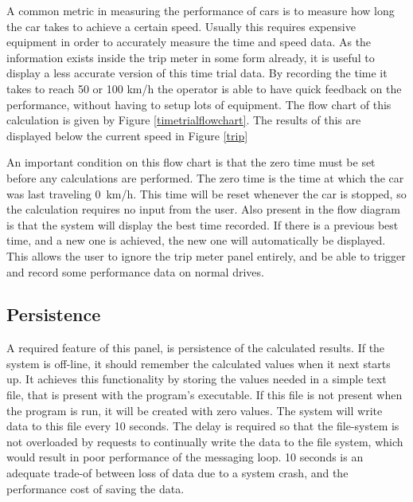 A common metric in measuring the performance of cars is to measure how long the car takes to achieve a certain speed. Usually this requires expensive equipment in order to accurately measure the time and speed data. As the information exists inside the trip meter in some form already, it is useful to display a less accurate version of this time trial data. By recording the time it takes to reach 50 or 100 km/h the operator is able to have quick feedback on the performance, without having to setup lots of equipment. The flow chart of this calculation is given by Figure \ref{timetrialflowchart}. The results of this are displayed below the current speed in Figure \ref{trip}


An important condition on this flow chart is that the zero time must be set before any calculations are performed. The zero time is the time at which the car was last traveling 0~km/h. This time will be reset whenever the car is stopped, so the calculation requires no input from the user. Also present in the flow diagram is that the system will display the best time recorded. If there is a previous best time, and a new one is achieved, the new one will automatically be displayed. This allows the user to ignore the trip meter panel entirely, and be able to trigger and record some performance data on normal drives.

\subsection{Persistence}
\label{sec:tripersistence}

A required feature of this panel, is persistence of the calculated results. If the system is off-line, it should remember the calculated values when it next starts up. It achieves this functionality by storing the values needed in a simple text file, that is present with the program's executable. If this file is not present when the program is run, it will be created with zero values. The system will write data to this file every 10 seconds. The delay is required so that the file-system is not overloaded by requests to continually write the data to the file system, which would result in poor performance of the messaging loop. 10 seconds is an adequate trade-of between loss of data due to a system crash, and the performance cost of saving the data.


